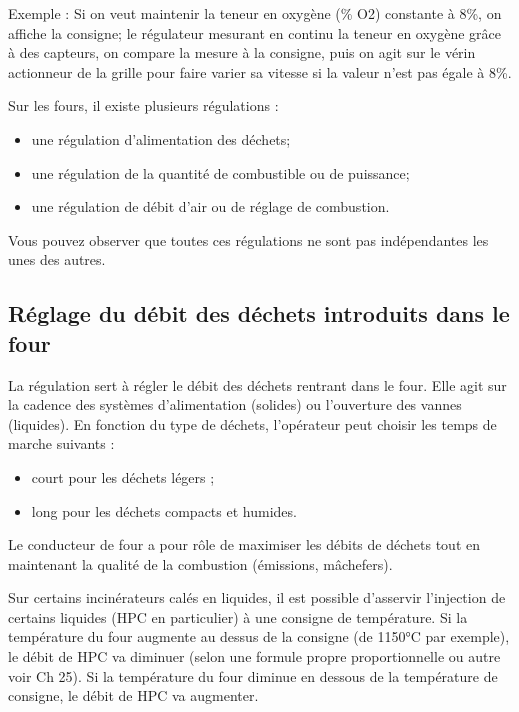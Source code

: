Exemple :
Si on veut maintenir la teneur en oxygène (\% O2) constante à 8\%, on affiche la consigne; le régulateur mesurant en continu la teneur en oxygène grâce à des capteurs, on compare la mesure à la consigne, puis on agit sur le vérin actionneur de la grille pour faire varier sa vitesse si la valeur n’est pas égale à 8\%.

Sur les fours, il existe plusieurs régulations :

\begin{itemize}
\item une régulation d’alimentation des déchets;
\item une régulation de la quantité de combustible ou de puissance;
\item une régulation de débit d’air ou de réglage de combustion.
\end{itemize}



Vous pouvez observer que toutes ces régulations ne sont pas indépendantes les unes des autres.

 
\subsection{Réglage du débit des déchets introduits dans le four}

La régulation sert à régler le débit des déchets rentrant dans le four. Elle agit sur la cadence des systèmes d’alimentation (solides) ou l’ouverture des vannes (liquides).
En fonction du type de déchets, l’opérateur peut choisir les temps de marche suivants :

\begin{itemize}
\item court pour les déchets légers ;
\item long pour les déchets compacts et humides.
\end{itemize}


Le conducteur de four a pour rôle de maximiser les débits de déchets tout en maintenant la qualité de la combustion (émissions, mâchefers).
\vspace{0.3cm}


Sur certains incinérateurs calés en liquides, il est possible d’asservir l’injection de certains liquides (HPC en particulier) à une consigne de température.
Si la température du four augmente au dessus de la consigne (de 1150°C par exemple), le débit de HPC va diminuer (selon une formule propre proportionnelle ou autre voir Ch 25).
Si la température du four diminue en dessous de la température de consigne, le débit de HPC va augmenter.



